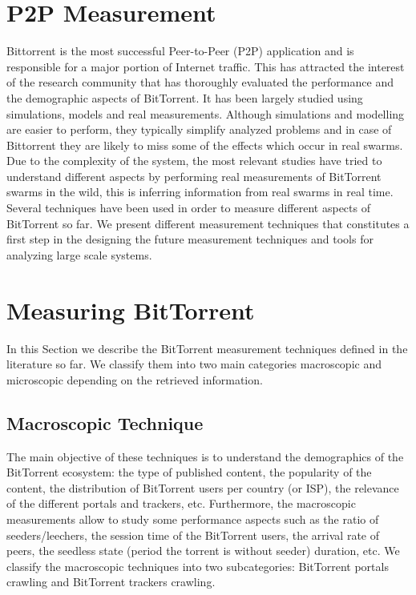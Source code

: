 \section{P2P Measurement}


Bittorrent is the most successful Peer-to-Peer (P2P) application and is responsible for a major portion of Internet traffic. 
This has attracted the interest of the research community that has thoroughly evaluated the performance and the demographic aspects of BitTorrent. 
It has been largely studied using simulations, models and real measurements. 
Although simulations and modelling are easier to perform, they typically simplify analyzed problems and in case of Bittorrent they are likely to miss some of the effects which occur in real swarms. 
Due to the complexity of the system, the most relevant studies have tried to understand different aspects by performing real measurements of BitTorrent swarms in the wild, this is inferring information from real swarms in real time.
Several techniques have been used in order to measure different aspects of BitTorrent so far. 
We present different measurement techniques that constitutes a first step in the designing the future measurement techniques and tools for analyzing large scale systems.

\section{Measuring BitTorrent}
In this Section we describe the BitTorrent measurement techniques defined in the literature so far. 
We classify them into two main categories macroscopic and microscopic depending on the retrieved information. 

\subsection{Macroscopic Technique}
The main objective of these techniques is to understand the demographics of the BitTorrent ecosystem: the type of published content, the popularity of the content, the distribution of BitTorrent users per country (or ISP), the relevance of the different portals and trackers, etc. 
Furthermore, the macroscopic measurements allow to study some performance aspects such as the ratio of seeders/leechers, the session time of the BitTorrent users, the arrival rate of peers, the seedless state (period the torrent is without seeder) duration, etc.
We classify the macroscopic techniques into two subcategories: BitTorrent portals crawling and BitTorrent trackers crawling.

